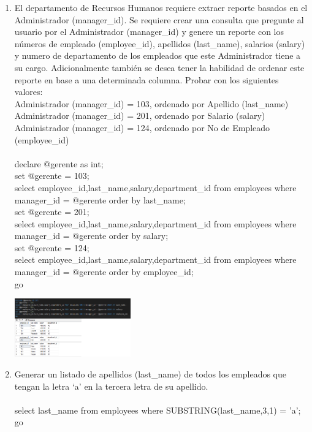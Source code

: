 \begin{enumerate}[1.]
	\item El departamento de Recursos Humanos requiere extraer reporte basados en el Administrador (manager\_id). Se requiere crear una consulta que pregunte al usuario por el Administrador (manager\_id) y genere un reporte con los números de empleado (employee\_id), apellidos (last\_name), salarios (salary) y numero de departamento de los empleados que este Administrador tiene a su cargo. Adicionalmente también se desea tener la habilidad de ordenar este reporte en base a una determinada columna. Probar con los siguientes valores:
	\\Administrador (manager\_id) = 103, ordenado por Apellido (last\_name)
	\\Administrador (manager\_id) = 201, ordenado por Salario (salary)
	\\Administrador (manager\_id) = 124, ordenado por No de Empleado (employee\_id)
	\\ \\declare @gerente as int;
	\\set @gerente = 103;
	\\select employee\_id,last\_name,salary,department\_id from employees where manager\_id = @gerente order by last\_name;
	\\set @gerente = 201;
	\\select employee\_id,last\_name,salary,department\_id from employees where manager\_id = @gerente order by salary;
	\\set @gerente = 124;
	\\select employee\_id,last\_name,salary,department\_id from employees where manager\_id = @gerente order by employee\_id;
	\\go
	
	\begin{center}
	\includegraphics[width=5cm]{./Imagenes/actividad_04_11} 
	\end{center}

	\item Generar un listado de apellidos (last\_name) de todos los empleados que tengan la letra ‘a’ en la tercera letra de su apellido.
	\\ \\select last\_name from employees where SUBSTRING(last\_name,3,1) = 'a';
	\\go


\end{enumerate}
